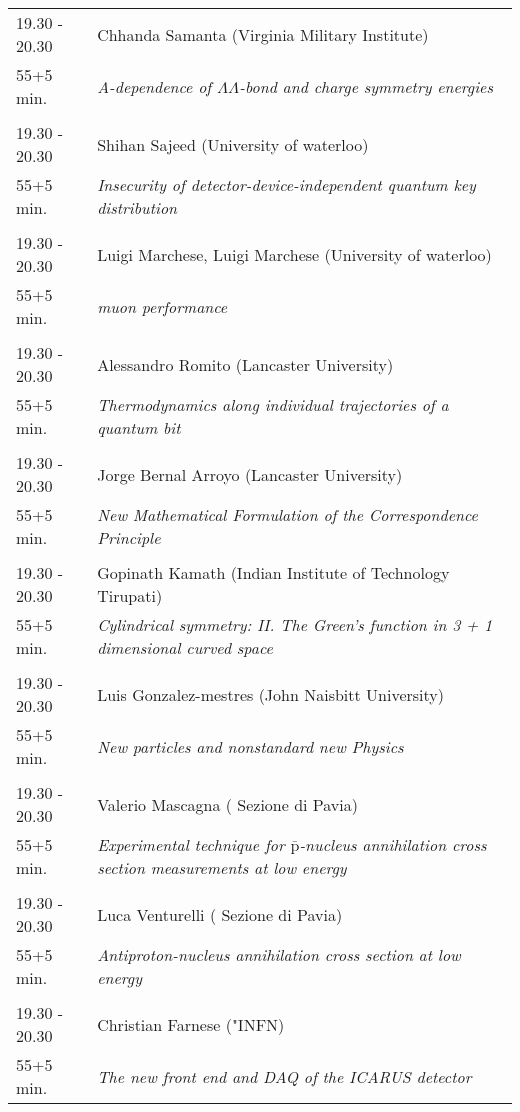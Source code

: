 \begin{longtable}{p{3cm}p{13cm}}
19.30 - 20.30 & Chhanda Samanta (Virginia Military Institute)\\ 
55+5 min. & {\it A-dependence of $\Lambda\Lambda$-bond and charge symmetry energies}\\ 
 & \\ 
19.30 - 20.30 & Shihan Sajeed (University of waterloo)\\ 
55+5 min. & {\it Insecurity of detector-device-independent quantum key distribution}\\ 
 & \\ 
19.30 - 20.30 & Luigi Marchese, Luigi Marchese (University of waterloo)\\ 
55+5 min. & {\it muon performance}\\ 
 & \\ 
19.30 - 20.30 & Alessandro Romito (Lancaster University)\\ 
55+5 min. & {\it Thermodynamics along individual trajectories of a quantum bit}\\ 
 & \\ 
19.30 - 20.30 & Jorge Bernal Arroyo (Lancaster University)\\ 
55+5 min. & {\it New Mathematical Formulation of the Correspondence Principle}\\ 
 & \\ 
19.30 - 20.30 & Gopinath Kamath (Indian Institute of Technology Tirupati)\\ 
55+5 min. & {\it Cylindrical symmetry: II. The Green’s function in 3 + 1 dimensional curved space}\\ 
 & \\ 
19.30 - 20.30 & Luis Gonzalez-mestres (John Naisbitt University)\\ 
55+5 min. & {\it New particles and nonstandard new Physics}\\ 
 & \\ 
19.30 - 20.30 & Valerio Mascagna ( Sezione di Pavia)\\ 
55+5 min. & {\it Experimental technique for $\mathrm{\bar{p}}$-nucleus annihilation cross section measurements at low energy}\\ 
 & \\ 
19.30 - 20.30 & Luca Venturelli ( Sezione di Pavia)\\ 
55+5 min. & {\it Antiproton-nucleus annihilation cross section at low energy}\\ 
 & \\ 
19.30 - 20.30 & Christian Farnese ("INFN)\\ 
55+5 min. & {\it The new front end and DAQ of the ICARUS detector}\\ 

\end{longtable}

